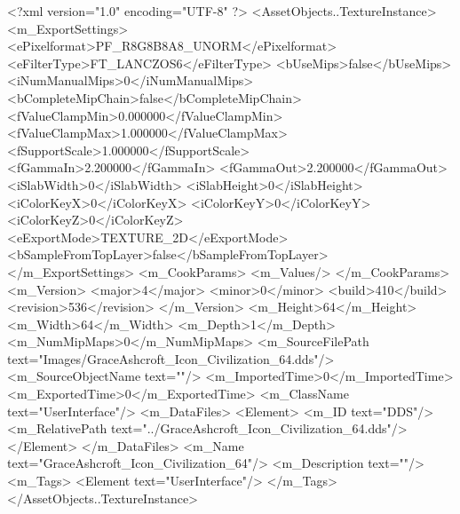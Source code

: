 <?xml version="1.0" encoding="UTF-8" ?>
<AssetObjects..TextureInstance>
	<m_ExportSettings>
		<ePixelformat>PF_R8G8B8A8_UNORM</ePixelformat>
		<eFilterType>FT_LANCZOS6</eFilterType>
		<bUseMips>false</bUseMips>
		<iNumManualMips>0</iNumManualMips>
		<bCompleteMipChain>false</bCompleteMipChain>
		<fValueClampMin>0.000000</fValueClampMin>
		<fValueClampMax>1.000000</fValueClampMax>
		<fSupportScale>1.000000</fSupportScale>
		<fGammaIn>2.200000</fGammaIn>
		<fGammaOut>2.200000</fGammaOut>
		<iSlabWidth>0</iSlabWidth>
		<iSlabHeight>0</iSlabHeight>
		<iColorKeyX>0</iColorKeyX>
		<iColorKeyY>0</iColorKeyY>
		<iColorKeyZ>0</iColorKeyZ>
		<eExportMode>TEXTURE_2D</eExportMode>
		<bSampleFromTopLayer>false</bSampleFromTopLayer>
	</m_ExportSettings>
	<m_CookParams>
		<m_Values/>
	</m_CookParams>
	<m_Version>
		<major>4</major>
		<minor>0</minor>
		<build>410</build>
		<revision>536</revision>
	</m_Version>
	<m_Height>64</m_Height>
	<m_Width>64</m_Width>
	<m_Depth>1</m_Depth>
	<m_NumMipMaps>0</m_NumMipMaps>
	<m_SourceFilePath text="Images/GraceAshcroft_Icon_Civilization_64.dds"/>
	<m_SourceObjectName text=""/>
	<m_ImportedTime>0</m_ImportedTime>
	<m_ExportedTime>0</m_ExportedTime>
	<m_ClassName text="UserInterface"/>
	<m_DataFiles>
		<Element>
			<m_ID text="DDS"/>
			<m_RelativePath text="../GraceAshcroft_Icon_Civilization_64.dds"/>
		</Element>
	</m_DataFiles>
	<m_Name text="GraceAshcroft_Icon_Civilization_64"/>
	<m_Description text=""/>
	<m_Tags>
		<Element text="UserInterface"/>
	</m_Tags>
</AssetObjects..TextureInstance>
